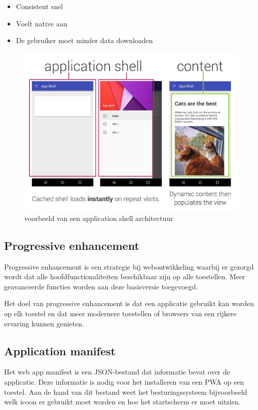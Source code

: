 	\begin{itemize}
		\item	Consistent snel
		\item	Voelt native aan
		\item	De gebruiker moet minder data downloaden
	\end{itemize}
	\autocite{Osmani2019a}
	
	\begin{figure}[!htb]
		\centering
		\includegraphics{./img/ApplicationShell.png}
		\caption{voorbeeld van een application shell architectuur \autocite{Osmani2015}}
	\end{figure}
	
\newpage
\subsection{Progressive enhancement}
	Progressive enhancement is een strategie bij webontwikkeling waarbij er gezorgd wordt dat alle hoofdfunctionaliteiten beschikbaar zijn op alle toestellen. Meer geavanceerde functies worden aan deze basisversie toegevoegd. 
	
	Het doel van progressive enhancement is dat een applicatie gebruikt kan worden op elk toestel en dat meer modernere toestellen of browsers van een rijkere ervaring kunnen genieten.
	\autocite{Vanhala2017}
	
	
\subsection{Application manifest}
	Het web app manifest is een JSON-bestand dat informatie bevat over de applicatie. Deze informatie is nodig voor het installeren van een PWA op een toestel.
	Aan de hand van dit bestand weet het besturingssysteem bijvoorbeeld welk icoon er gebruikt moet worden en hoe het startscherm er moet uitzien.
	
